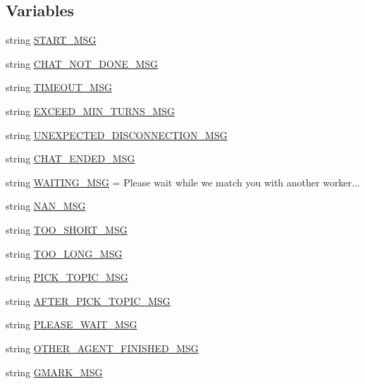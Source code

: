 \subsection*{Variables}
\begin{DoxyCompactItemize}
\item 
string \hyperlink{namespacemturk__evaluation__task_1_1worlds_ac285151d253e04ea0209c90c75ea946e}{S\+T\+A\+R\+T\+\_\+\+M\+SG}
\item 
string \hyperlink{namespacemturk__evaluation__task_1_1worlds_a543f306273a9e359a259a5f8786be30d}{C\+H\+A\+T\+\_\+\+N\+O\+T\+\_\+\+D\+O\+N\+E\+\_\+\+M\+SG}
\item 
string \hyperlink{namespacemturk__evaluation__task_1_1worlds_a477e4c24daba97f11512810833cff1c3}{T\+I\+M\+E\+O\+U\+T\+\_\+\+M\+SG}
\item 
string \hyperlink{namespacemturk__evaluation__task_1_1worlds_acdf4161216fc61160b0d5c7420ab1421}{E\+X\+C\+E\+E\+D\+\_\+\+M\+I\+N\+\_\+\+T\+U\+R\+N\+S\+\_\+\+M\+SG}
\item 
string \hyperlink{namespacemturk__evaluation__task_1_1worlds_a73f8c1ccbfa8c8831c5a76f545257a66}{U\+N\+E\+X\+P\+E\+C\+T\+E\+D\+\_\+\+D\+I\+S\+C\+O\+N\+N\+E\+C\+T\+I\+O\+N\+\_\+\+M\+SG}
\item 
string \hyperlink{namespacemturk__evaluation__task_1_1worlds_a2ca1349786937604567008b74510e9e3}{C\+H\+A\+T\+\_\+\+E\+N\+D\+E\+D\+\_\+\+M\+SG}
\item 
string \hyperlink{namespacemturk__evaluation__task_1_1worlds_a55c6bb50d79fc2fd088df8cb8a940fc7}{W\+A\+I\+T\+I\+N\+G\+\_\+\+M\+SG} = \textquotesingle{}Please wait while we match you with another worker...\textquotesingle{}
\item 
string \hyperlink{namespacemturk__evaluation__task_1_1worlds_aba56b9ed87396e8825170ace11113d92}{N\+A\+N\+\_\+\+M\+SG}
\item 
string \hyperlink{namespacemturk__evaluation__task_1_1worlds_a416d67f0648299b9cc17258469f2a92d}{T\+O\+O\+\_\+\+S\+H\+O\+R\+T\+\_\+\+M\+SG}
\item 
string \hyperlink{namespacemturk__evaluation__task_1_1worlds_a97f4c882bd571dbdc5225fbde6b17926}{T\+O\+O\+\_\+\+L\+O\+N\+G\+\_\+\+M\+SG}
\item 
string \hyperlink{namespacemturk__evaluation__task_1_1worlds_aa36a2954686056975c7648bf5a81bfca}{P\+I\+C\+K\+\_\+\+T\+O\+P\+I\+C\+\_\+\+M\+SG}
\item 
string \hyperlink{namespacemturk__evaluation__task_1_1worlds_a353d93a390d3ae48dd6f094a2e9dc9b2}{A\+F\+T\+E\+R\+\_\+\+P\+I\+C\+K\+\_\+\+T\+O\+P\+I\+C\+\_\+\+M\+SG}
\item 
string \hyperlink{namespacemturk__evaluation__task_1_1worlds_a04cb02adc9f9bd549a7ac5eeccd96e90}{P\+L\+E\+A\+S\+E\+\_\+\+W\+A\+I\+T\+\_\+\+M\+SG}
\item 
string \hyperlink{namespacemturk__evaluation__task_1_1worlds_a5ed691ea7cb63087533221ab6598a20c}{O\+T\+H\+E\+R\+\_\+\+A\+G\+E\+N\+T\+\_\+\+F\+I\+N\+I\+S\+H\+E\+D\+\_\+\+M\+SG}
\item 
string \hyperlink{namespacemturk__evaluation__task_1_1worlds_a9a2c4ec1c2b6fae63e448ba6be717206}{G\+M\+A\+R\+K\+\_\+\+M\+SG}
\end{DoxyCompactItemize}


